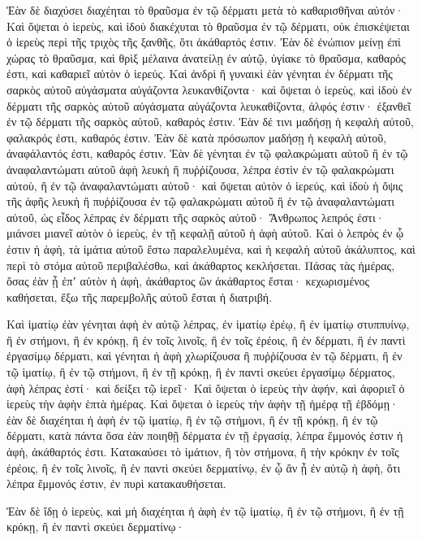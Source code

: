 {Ἐὰν δὲ διαχύσει διαχέηται τὸ θραῦσμα ἐν τῷ δέρματι μετὰ τὸ καθαρισθῆναι αὐτόν·
Καὶ ὄψεται ὁ ἱερεὺς, καὶ ἰδοὺ διακέχυται τὸ θραῦσμα ἐν τῷ δέρματι, οὐκ ἐπισκέψεται ὁ ἱερεὺς περὶ τῆς τριχὸς τῆς ξανθῆς, ὅτι ἀκάθαρτός ἐστιν.
Ἐὰν δὲ ἐνώπιον μείνῃ ἐπὶ χώρας τὸ θραῦσμα, καὶ θρὶξ μέλαινα ἀνατείλῃ ἐν αὐτῷ, ὑγίακε τὸ θραῦσμα, καθαρός ἐστι, καὶ καθαριεῖ αὐτὸν ὁ ἱερεύς.
Καὶ ἀνδρὶ ἢ γυναικὶ ἐὰν γένηται ἐν δέρματι τῆς σαρκὸς αὐτοῦ αὐγάσματα αὐγάζοντα λευκανθίζοντα·
καὶ ὄψεται ὁ ἱερεὺς, καὶ ἰδοὺ ἐν δέρματι τῆς σαρκὸς αὐτοῦ αὐγάσματα αὐγάζοντα λευκαθίζοντα, ἀλφός ἐστιν· ἐξανθεῖ ἐν τῷ δέρματι τῆς σαρκὸς αὐτοῦ, καθαρός ἐστιν.
Ἐὰν δέ τινι μαδήσῃ ἡ κεφαλὴ αὐτοῦ, φαλακρός ἐστι, καθαρός ἐστιν.
Ἐὰν δὲ κατὰ πρόσωπον μαδήσῃ ἡ κεφαλὴ αὐτοῦ, ἀναφάλαντός ἐστι, καθαρός ἐστιν.
Ἐὰν δὲ γένηται ἐν τῷ φαλακρώματι αὐτοῦ ἢ ἐν τῷ ἀναφαλαντώματι αὐτοῦ ἁφὴ λευκὴ ἢ πυῤῥίζουσα, λέπρα ἐστὶν ἐν τῷ φαλακρώματι αὐτοὺ, ἢ ἐν τῷ ἀναφαλαντώματι αὐτοῦ·
καὶ ὄψεται αὐτὸν ὁ ἱερεύς, καὶ ἰδοὺ ἡ ὄψις τῆς ἁφῆς λευκὴ ἢ πυῤῥίζουσα ἐν τῷ φαλακρώματι αὐτοῦ ἢ ἐν τῷ ἀναφαλαντώματι αὐτοῦ, ὡς εἶδος λέπρας ἐν δέρματι τῆς σαρκὸς αὐτοῦ·
Ἄνθρωπος λεπρός ἐστι· μιάνσει μιανεῖ αὐτὸν ὁ ἱερεὺς, ἐν τῇ κεφαλῇ αὐτοῦ ἡ ἁφὴ αὐτοῦ.
Καὶ ὁ λεπρὸς ἐν ᾧ ἐστιν ἡ ἁφὴ, τὰ ἱμάτια αὐτοῦ ἔστω παραλελυμένα, καὶ ἡ κεφαλὴ αὐτοῦ ἀκάλυπτος, καὶ περὶ τὸ στόμα αὐτοῦ περιβαλέσθω, καὶ ἀκάθαρτος κεκλήσεται.
Πάσας τὰς ἡμέρας, ὅσας ἐὰν ᾖ ἐπʼ αὐτὸν ἡ ἁφὴ, ἀκάθαρτος ὢν ἀκάθαρτος ἔσται· κεχωρισμένος καθήσεται, ἔξω τῆς παρεμβολῆς αὐτοῦ ἔσται ἡ διατριβή.
\par }{\PP {}Καὶ ἱματίῳ ἐὰν γένηται ἁφὴ ἐν αὐτῷ λέπρας, ἐν ἱματίῳ ἐρέῳ, ἢ ἐν ἱματίῳ στυππυίνῳ,
ἢ ἐν στήμονι, ἢ ἐν κρόκῃ, ἢ ἐν τοῖς λινοῖς, ἢ ἐν τοῖς ἐρέοις, ἢ ἐν δέρματι, ἢ ἐν παντὶ ἐργασίμῳ δέρματι,
καὶ γένηται ἡ ἁφὴ χλωρίζουσα ἢ πυῤῥίζουσα ἐν τῷ δέρματι, ἢ ἐν τῷ ἱματίῳ, ἢ ἐν τῷ στήμονι, ἢ ἐν τῇ κρόκῃ, ἢ ἐν παντὶ σκεύει ἐργασίμῳ δέρματος, ἁφὴ λέπρας ἐστί· καὶ δείξει τῷ ἱερεῖ·
Καὶ ὄψεται ὁ ἱερεὺς τὴν ἁφήν, καὶ ἀφοριεῖ ὁ ἱερεὺς τὴν ἁφὴν ἑπτὰ ἡμέρας.
Καὶ ὄψεται ὁ ἱερεὺς τὴν ἁφὴν τῇ ἡμέρᾳ τῇ ἑβδόμῃ· ἐὰν δὲ διαχέηται ἡ ἁφὴ ἐν τῷ ἱματίῳ, ἢ ἐν τῷ στήμονι, ἢ ἐν τῇ κρόκῃ, ἢ ἐν τῷ δέρματι, κατὰ πάντα ὅσα ἐὰν ποιηθῇ δέρματα ἐν τῇ ἐργασίᾳ, λέπρα ἔμμονός ἐστιν ἡ ἁφὴ, ἀκάθαρτός ἐστι.
Κατακαύσει τὸ ἱμάτιον, ἢ τὸν στήμονα, ἢ τὴν κρόκην ἐν τοῖς ἐρέοις, ἢ ἐν τοῖς λινοῖς, ἢ ἐν παντὶ σκεύει δερματίνῳ, ἐν ᾧ ἂν ᾖ ἐν αὐτῷ ἡ ἁφὴ, ὅτι λέπρα ἔμμονός ἐστιν, ἐν πυρὶ κατακαυθήσεται.
\par }{\PP {}Ἐὰν δὲ ἴδῃ ὁ ἱερεὺς, καὶ μὴ διαχέηται ἡ ἁφὴ ἐν τῷ ἱματίῳ, ἢ ἐν τῷ στήμονι, ἢ ἐν τῇ κρόκῃ, ἢ ἐν παντὶ σκεύει δερματίνῳ·
}
